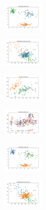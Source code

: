 \begin{figure}[H]
\begin{subfigure}
        \centering
        \includegraphics[width=0.234\textwidth]{img/hs-ls-v2/rand_set_const_10_277451237_clust.png}
    \end{subfigure}
    \hfill
    \begin{subfigure}
        \centering
        \includegraphics[width=0.234\textwidth]{img/hs-ls-v2/newthyroid_set_const_10_277451237_clust.png}
    \end{subfigure}
    \hfill
    \begin{subfigure}
        \centering
        \includegraphics[width=0.234\textwidth]{img/hs-ls-v2/iris_set_const_10_49258669_clust.png}
    \end{subfigure}
    \hfill
    \begin{subfigure}
        \centering
        \includegraphics[width=0.234\textwidth]{img/hs-ls-v2/ecoli_set_const_10_49258669_clust.png}
    \end{subfigure}
    \hfill
    \begin{subfigure}
        \centering
        \includegraphics[width=0.234\textwidth]{img/hs-ls-v2/rand_set_const_10_49258669_clust.png}
    \end{subfigure}
    \hfill
    \begin{subfigure}
        \centering
        \includegraphics[width=0.234\textwidth]{img/hs-ls-v2/newthyroid_set_const_10_49258669_clust.png}

\end{subfigure}
\end{figure}
